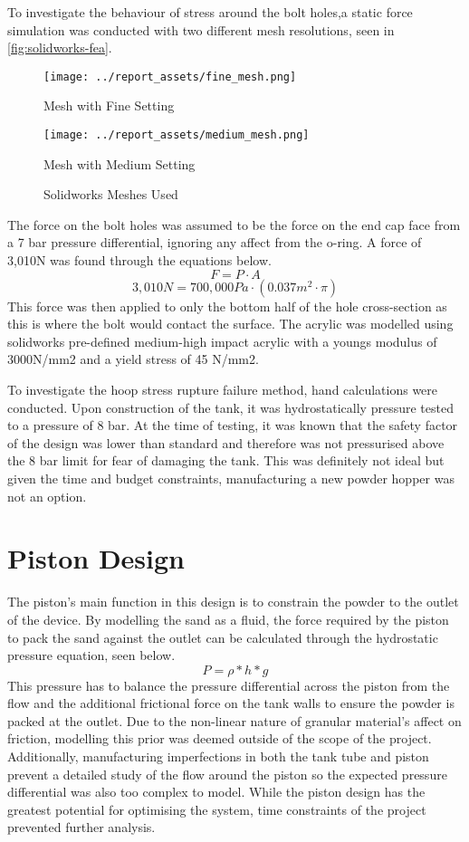 To investigate the behaviour of stress around the bolt holes,a static force simulation was conducted with two different mesh resolutions, seen in \autoref{fig:solidworks-fea}. 
\begin{figure}[htbp]
    \centering

    \begin{minipage}{0.45\textwidth}
        \centering
        \texttt{[image: ../report\_assets/fine\_mesh.png]}
        \caption*{Mesh with Fine Setting}
    \end{minipage}
    \hfill
    \begin{minipage}{0.45\textwidth}
        \centering
        \texttt{[image: ../report\_assets/medium\_mesh.png]}
        \caption*{Mesh with Medium Setting}
    \end{minipage}
    \caption{Solidworks Meshes Used}\label{fig:solidworks-fea}
\end{figure}
The force on the bolt holes was assumed to be the force on the end cap face from a 7 bar pressure differential, ignoring any affect from the o-ring. A force of 3,010N was found through the equations below.
\[
F = P \cdot A
\]
\[
3,010N = 700,000Pa \cdot (0.037m^2 \cdot \pi)
\]
This force was then applied to only the bottom half of the hole cross-section as this is where the bolt would contact the surface. The acrylic was modelled using solidworks pre-defined medium-high impact acrylic with a youngs modulus of 3000N/mm2 and a yield stress of 45 N/mm2.

To investigate the hoop stress rupture failure method, hand calculations were conducted.
Upon construction of the tank, it was hydrostatically pressure tested to a pressure of 8 bar. At the time of testing, it was known that the safety factor of the design was lower than standard and therefore was not pressurised above the 8 bar limit for fear of damaging the tank. This was definitely not ideal but given the time and budget constraints, manufacturing a new powder hopper was not an option.

\section{Piston Design}\label{sec:piston}
The piston's main function in this design is to constrain the powder to the outlet of the device. By modelling the sand as a fluid, the force required by the piston to pack the sand against the outlet can be calculated through the hydrostatic pressure equation, seen below. 
\[
P = \rho * h * g
\]
This pressure has to balance the pressure differential across the piston from the flow and the additional frictional force on the tank walls to ensure the powder is packed at the outlet. Due to the non-linear nature of granular material's affect on friction, modelling this prior was deemed outside of the scope of the project. Additionally, manufacturing imperfections in both the tank tube and piston prevent a detailed study of the flow around the piston so the expected pressure differential was also too complex to model. While the piston design has the greatest potential for optimising the system, time constraints of the project prevented further analysis.

